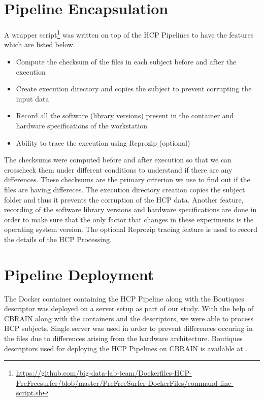 \section{Pipeline Encapsulation}
A wrapper script\footnote{\url{https://github.com/big-data-lab-team/Dockerfiles-HCP-PreFreesurfer/blob/master/PreFreeSurfer-DockerFiles/command-line-script.sh}} was written on top of the HCP Pipelines to have the features which are listed below. 
\begin{itemize}
  \item Compute the checksum of the files in each subject before and after the execution
  \item Create execution directory and copies the subject to prevent corrupting the input data
  \item Record all the software (library versions) present in the container and hardware specifications of the workstation
  \item Ability to trace the execution using Reprozip (optional)
\end{itemize}

The checksums were computed before and after execution so that we can crosscheck them under different conditions to understand if there are any differences. These checksums are the primary criterion we use to find out if the files are having differeces. The execution directory creation copies the subject folder and thus it prevents the corruption of the HCP data. Another feature, recording of the software library versions and hardware specifications are done in order to make sure that the only factor that changes in these experiments is the operating system version. The optional Reprozip tracing feature is used to record the details of the HCP Processing.

\section{Pipeline Deployment}
The Docker container containing the HCP Pipeline along with the Boutiques descriptor was deployed on a server setup as part of our study. With the help of CBRAIN along with the containers and the descriptors, we were able to process HCP subjects. Single server was used in order to prevent differences occuring in the files due to differences arising from the hardware architecture. Boutiques descriptors used for deploying the HCP Pipelines on CBRAIN is available at \cite{HCP_descriptors}.


